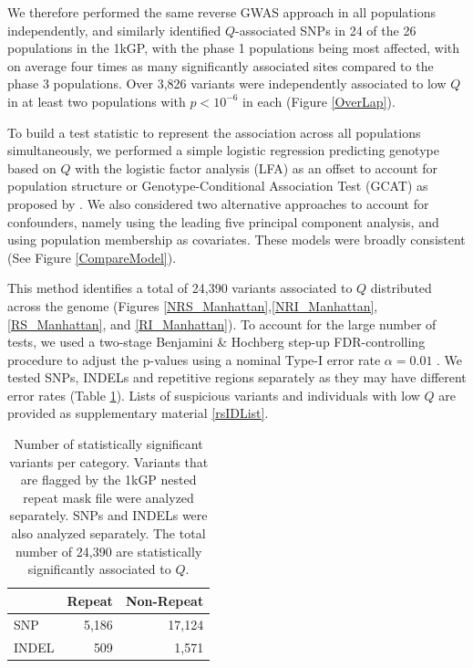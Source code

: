 \documentclass[9pt,lineno]{elife}
\begin{document}
We therefore performed the same reverse GWAS approach in all populations independently, and similarly identified $Q$-associated SNPs in 24 of the 26 populations in the 1kGP, with the phase 1 populations being most affected, with on average four times as many significantly associated sites compared to the phase 3 populations.
Over 3,826 variants were independently associated to low $Q$ in at least two populations with $ p < 10^{-6}$ in each (Figure \ref{OverLap}).

To build a test statistic to represent the association across all populations simultaneously, we performed a simple logistic regression predicting genotype based on $Q$ with the logistic factor analysis (LFA) as an offset to account for population structure or Genotype-Conditional Association Test  (GCAT) as proposed by \citep{song2015testing}. 
We also considered two alternative approaches to account for confounders, namely using the leading five  principal component analysis, and using population membership as covariates. 
These models were broadly consistent (See Figure \ref{CompareModel}).

This method identifies a total of 24,390 variants associated to $Q$ distributed across the genome (Figures \ref{NRS_Manhattan},\ref{NRI_Manhattan}, \ref{RS_Manhattan}, and \ref{RI_Manhattan}). 
To account for the large number of tests, we used a two-stage Benjamini \& Hochberg step-up FDR-controlling procedure to adjust the p-values using a nominal Type-I error rate $\alpha = 0.01$ \citep{Benjamini2006}. 
We tested SNPs, INDELs and repetitive regions separately as they may have different error rates (Table \ref{sigTable}).
Lists of suspicious variants and individuals with low $Q$ are provided as supplementary material \ref{rsIDList}.


\begin{table}
\centering
\begin{tabular}{l  r r}
                      & {Repeat}  & {Non-Repeat}       \\ \hline
{SNP}  & 5,186 & 17,124 \\  
{INDEL} & 509 & 1,571 \\ \hline
\end{tabular}
\caption{Number of statistically significant variants per category. 
Variants that are flagged by the 1kGP nested repeat mask file were analyzed separately. 
SNPs and INDELs were also analyzed separately. 
The total number of 24,390 are statistically significantly associated to $Q$.}
\label{sigTable}
\end{table}
\end{document}
